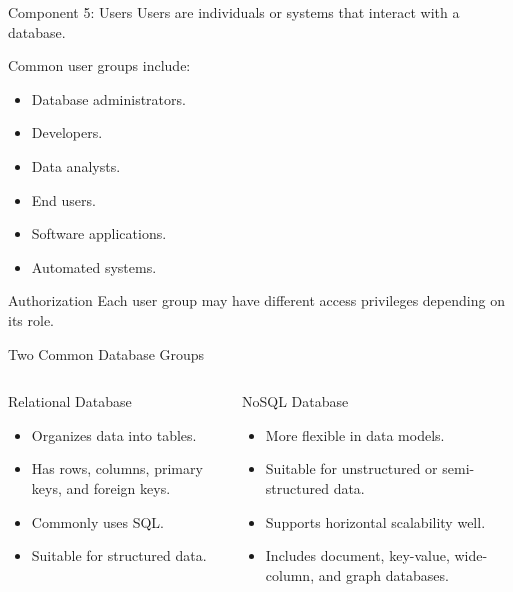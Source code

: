 \documentclass[aspectratio=169,11pt]{beamer}
\newcommand{\tightlist}{\setlength{\itemsep}{2pt}\setlength{\parskip}{0pt}}
\begin{document}
\begin{frame}{Component 5: Users}
\small
Users are individuals or systems that interact with a database.

\vspace{0.15cm}
Common user groups include:
\begin{itemize}
\tightlist
  \item Database administrators.
  \item Developers.
  \item Data analysts.
  \item End users.
  \item Software applications.
  \item Automated systems.
\end{itemize}

\begin{block}{Authorization}
Each user group may have different access privileges depending on its role.
\end{block}
\end{frame}

\begin{frame}{Two Common Database Groups}
\small
\begin{columns}[T]
\begin{block}{Relational Database}
\begin{itemize}
\tightlist
  \item Organizes data into tables.
  \item Has rows, columns, primary keys, and foreign keys.
  \item Commonly uses SQL.
  \item Suitable for structured data.
\end{itemize}
\end{block}

\begin{block}{NoSQL Database}
\begin{itemize}
\tightlist
  \item More flexible in data models.
  \item Suitable for unstructured or semi-structured data.
  \item Supports horizontal scalability well.
  \item Includes document, key-value, wide-column, and graph databases.
\end{itemize}
\end{block}
\end{columns}
\end{frame}
\end{document}
